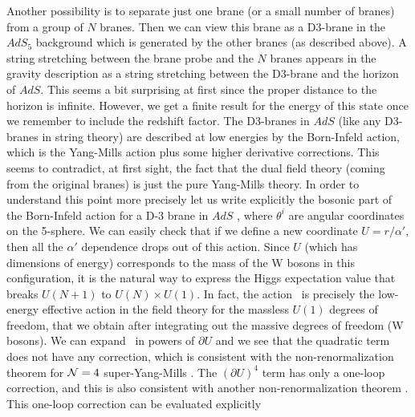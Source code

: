 Another possibility is to separate just one brane (or a small number
of branes) from a group of $N$ branes. Then we can view this brane as
a D3-brane in the $AdS_5$ background which is generated by the other
branes (as described above).  A string stretching between the brane
probe and the $N$ branes appears in the gravity description as a
string stretching between the D3-brane and the horizon of $AdS$.  This
seems a bit surprising at first since the proper distance to the
horizon is infinite. However, we get a finite result for the energy of
this state once we remember to include the redshift factor.  The
D3-branes in $AdS$ (like any D3-branes in string theory) are
described at low energies by the Born-Infeld action, which is the
Yang-Mills action plus 
some higher derivative corrections.
This seems to contradict, at first sight, the fact that
the dual field theory (coming from the original branes) is just the pure
Yang-Mills theory.
In order to understand this point more precisely let us write
explicitly the bosonic part of the Born-Infeld action for a D-3 brane
in $AdS$ \cite{Leigh:1989jq},
where $\theta^i$ are angular coordinates on the 5-sphere.           
We can easily check that if we define a new coordinate
 $U= r / \alpha'$, then
all the $\alpha'$ dependence drops out of this action. 
Since $U$ (which has dimensions of energy) 
corresponds to the mass of the W bosons in this configuration,
it is the natural way to express the Higgs 
expectation value that breaks $U(N+1)$ to $U(N)\times U(1)$.
In fact,  the action \borninf\ is precisely the  low-energy 
effective action in the field theory for
the massless $U(1)$ degrees of freedom, that we
obtain after integrating out the massive degrees of freedom (W bosons). 
We can expand \borninf\ in powers of $\partial U$ and
we see that the quadratic term does not have any correction, which
is consistent with the non-renormalization theorem for ${\cal N} =4 $ 
super-Yang-Mills \cite{Seiberg:1994aj}.
 The $(\partial U)^4 $ term has only a one-loop 
correction, 
 and this is also consistent with another non-renormalization
theorem \cite{Dine:1997nq}.
This one-loop correction can be evaluated explicitly
